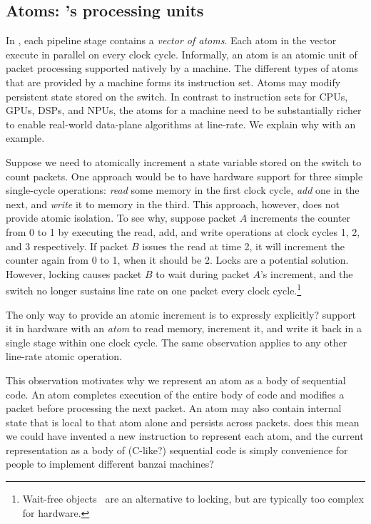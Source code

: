 \subsection{Atoms: \absmachine's processing units}
\label{ss:atoms}

In \absmachine, each pipeline stage contains a {\em vector of
  atoms}. Each atom in the vector execute in parallel on every clock
cycle.  Informally, an atom is an atomic unit of packet processing
supported natively by a \absmachine machine.
The different types of atoms that are provided by 
a \absmachine machine forms its instruction set.
Atoms may modify persistent state stored on the
switch. In contrast to instruction sets for CPUs, GPUs, DSPs, and
NPUs, the atoms for a \absmachine machine need to be substantially
richer to enable real-world data-plane algorithms at line-rate. We
explain why with an example.

Suppose we need to atomically increment a state variable stored on the
switch to count packets. One approach would be to have hardware
support for three simple single-cycle operations: \textit{read} some
memory in the first clock cycle, \textit{add} one in the next, and
\textit{write} it to memory in the third. This approach, however, does
not provide atomic isolation. To see why, suppose packet $A$
increments the counter from 0 to 1 by executing the read, add, and
write operations at clock cycles 1, 2, and 3 respectively.  If packet
$B$ issues the read at time 2, it will increment the counter again
from 0 to 1, when it should be 2. Locks are a potential
solution. However, locking causes packet $B$ to wait during packet
$A$'s increment, and the switch no longer sustains line rate on one
packet every clock cycle.\footnote{Wait-free
  objects~\cite{herlihy_wait} are an alternative to locking, but are
  typically too complex for hardware.}


The only way to provide an atomic increment is to expressly \ac{explicitly?}
support it
in hardware with an {\em atom} to read memory, increment it, and write
it back in a single stage within one clock cycle. The same observation
applies to any other line-rate atomic operation.  

This observation motivates why we represent an atom as a body of
sequential code. An atom completes execution of the entire body of
code and modifies a packet before processing the next packet.  An atom
may also contain internal state that is local to that atom alone and
persists across packets.
\ac{does this mean we could have invented a new
instruction to represent each atom, and the current representation as a
body of (C-like?) sequential code is simply convenience for people to 
implement different banzai machines?}

